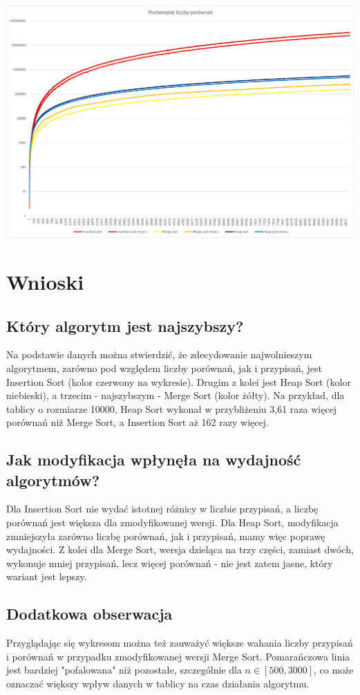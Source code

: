 \documentclass{article}
\begin{document}
\begin{center}
    \includegraphics[width=1\textwidth]{Wykres2.png}
\end{center}

\section{Wnioski}

\subsection{Który algorytm jest najszybszy?}

Na podstawie danych można stwierdzić, że zdecydowanie najwolnieszym algorytmem, zarówno pod względem liczby porównań, jak i przypisań, jest Insertion Sort (kolor czerwony na wykresie). Drugim z kolei jest Heap Sort (kolor niebieski), a trzecim - najszybszym - Merge Sort (kolor żółty). Na przykład, dla tablicy o rozmiarze 10000, Heap Sort wykonał w przybliżeniu 3,61 raza więcej porównań niż Merge Sort, a Insertion Sort aż 162 razy więcej. 

\subsection{Jak modyfikacja wpłynęła na wydajność algorytmów?}

Dla Insertion Sort nie wydać istotnej różnicy w liczbie przypisań, a liczbę porównań jest większa dla zmodyfikowanej wersji. Dla Heap Sort, modyfikacja zmniejszyła zarówno liczbę porównań, jak i przypisań, mamy więc poprawę wydajności. Z kolei dla Merge Sort, wersja dzieląca na trzy części, zamiast dwóch, wykonuje mniej przypisań, lecz więcej porównań - nie jest zatem jasne, który wariant jest lepszy.

\subsection{Dodatkowa obserwacja}

Przyglądając się wykresom można też zauważyć większe wahania liczby przypisań i porównań w przypadku zmodyfikowanej wersji Merge Sort. Pomarańczowa linia jest bardziej "pofalowana" niż pozostałe, szczególnie dla \(n \in [500, 3000]\), co może oznaczać większy wpływ danych w tablicy na czas działania algorytmu.
\end{document}
